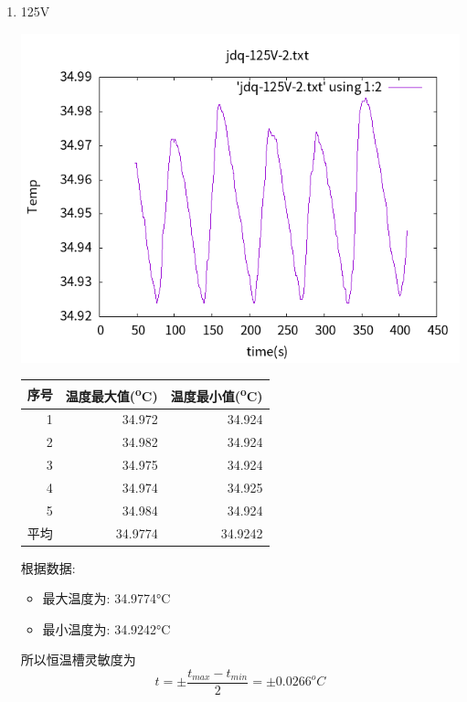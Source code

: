 \documentclass[11pt]{report}
\begin{document}
\begin{enumerate}
\item 125V
\label{sec:org747e9c3}
\begin{center}
\includegraphics[width=.9\linewidth]{../img/jdq-125V-2.txt.png}
\end{center}
\begin{center}
\begin{tabular}{rrr}
序号 & 温度最大值(\textsuperscript{o}C) & 温度最小值(\textsuperscript{o}C)\\
\hline
1 & 34.972 & 34.924\\
2 & 34.982 & 34.924\\
3 & 34.975 & 34.924\\
4 & 34.974 & 34.925\\
5 & 34.984 & 34.924\\
平均 & 34.9774 & 34.9242\\
\end{tabular}
\end{center}

根据数据:
\begin{itemize}
\item 最大温度为: 34.9774°C
\item 最小温度为: 34.9242°C
\end{itemize}
所以恒温槽灵敏度为
\[
t=\pm\frac{t_{max}-t_{min}}{2}=\pm 0.0266^{o}C
\]
\end{enumerate}
\end{document}
